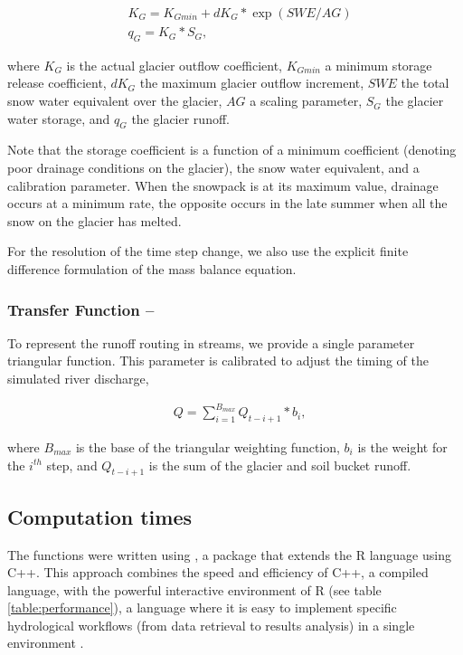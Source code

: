 \begin{align}
& K_G = K_{Gmin} + dK_G * \exp \left( SWE/AG \right) \\
& q_G = K_G * S_G ,
\end{align}

\noindent
where $K_{G}$ is the actual glacier outflow coefficient, $K_{Gmin}$ a minimum storage release coefficient, $dK_{G}$ the 
maximum glacier outflow increment, $SWE$ the total snow water equivalent over the glacier, $AG$ a scaling parameter, 
$S_G$ the glacier water storage, and $q_G$ the glacier runoff. 

Note that the storage coefficient is a function of a minimum coefficient (denoting poor drainage conditions on the glacier),
the snow water equivalent, and a calibration parameter. When the snowpack is at its maximum value, drainage occurs at 
a minimum rate, the opposite occurs in the late summer when all the snow on the glacier has melted. 

For the resolution of the time step change, we also use the explicit finite difference formulation of the mass balance equation.

\subsubsection{Transfer Function – }

To represent the runoff routing in streams, we provide a single parameter triangular function. This parameter is calibrated 
to adjust the timing of the simulated river discharge,

\begin{align}
& Q = \sum_{i=1}^{B_{max}} Q_{t-i+1} * b_i ,
\end{align}

\noindent
where $B_{max}$ is the base of the triangular weighting function, $b_i$ is the weight for the $i^{th}$ step, and $Q_{t-i+1}$
is the sum of the glacier and soil bucket runoff.  

\subsection{Computation times}

The  functions were written using  \citep{eddelbuettel:2013, rcpp:2019}, a package
that extends the R language using C++. This approach combines the speed and efficiency of C++, a compiled language, with the
powerful interactive environment of R (see table \ref{table:performance}), a language where it is easy to implement specific
hydrological workflows (from data retrieval to results analysis) in a single environment
\citep{slater:2019}. 

